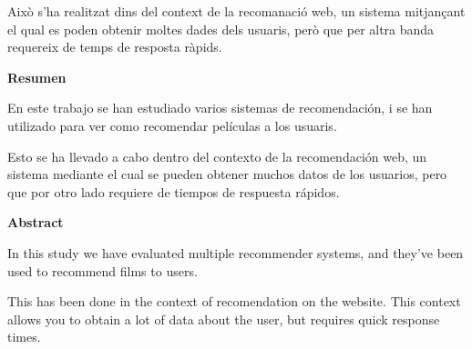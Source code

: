\documentclass[a4paper,12pt,catalan]{book}
\begin{document}
Això s'ha realitzat dins del context de la recomanació web, un sistema mitjançant el qual es poden obtenir moltes dades dels usuaris, però que per altra banda requereix de temps de resposta ràpids.

\vfill{}

{\par\centering \textbf{\large Resumen}\large \par}

En este trabajo se han estudiado varios sistemas de recomendación, i se han utilizado para ver como recomendar películas a los usuaris.

Esto se ha llevado a cabo dentro del contexto de la recomendación web, un sistema mediante el cual se pueden obtener muchos datos de los usuarios, pero que por otro lado requiere de tiempos de respuesta rápidos.

\vfill{}

{\par\centering \textbf{\large Abstract}\large \par}

In this study we have evaluated multiple recommender systems, and they've been used to recommend films to users.

This has been done in the context of recomendation on the website. This context allows you to obtain a lot of data about the user, but requires quick response times.

\vfill{}
\end{document}
